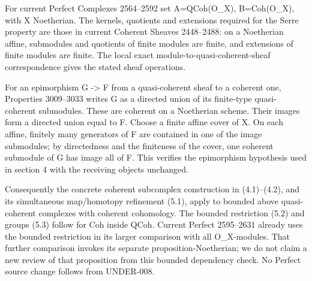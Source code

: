 For current Perfect Complexes 2564–\allowbreak{}2592 set A\allowbreak{}=QCoh(O\_\allowbreak{}X)\allowbreak{},\allowbreak{} B\allowbreak{}=Coh(O\_\allowbreak{}X)\allowbreak{},\allowbreak{} with X Noetherian. The kernels,\allowbreak{} quotients and extensions required for the Serre property are those in current Coherent Sheaves 2448–\allowbreak{}2488:\allowbreak{} on a Noetherian affine,\allowbreak{} submodules and quotients of finite modules are finite,\allowbreak{} and extensions of finite modules are finite. The local exact module-to-quasi-coherent-sheaf correspondence gives the stated sheaf operations.

For an epimorphism G \allowbreak{}-> F from a quasi-coherent sheaf to a coherent one,\allowbreak{} Properties 3009–\allowbreak{}3033 writes G as a directed union of its finite-type quasi-coherent submodules. These are coherent on a Noetherian scheme. Their images form a directed union equal to F. Choose a finite affine cover of X. On each affine,\allowbreak{} finitely many generators of F are contained in one of the image submodules; by directedness and the finiteness of the cover,\allowbreak{} one coherent submodule of G has image all of F. This verifies the epimorphism hypothesis used in section 4 with the receiving objects unchanged.

Consequently the concrete coherent subcomplex construction in (4.1)\allowbreak{}–\allowbreak{}(4.2)\allowbreak{},\allowbreak{} and its simultaneous map/\allowbreak{}homotopy refinement (5.1)\allowbreak{},\allowbreak{} apply to bounded above quasi-coherent complexes with coherent cohomology. The bounded restriction (5.2)\allowbreak{} and groups (5.3)\allowbreak{} follow for Coh inside QCoh. Current Perfect 2595–\allowbreak{}2631 already uses the bounded restriction in its larger comparison with all O\_\allowbreak{}X-modules. That further comparison invokes its separate proposition-Noetherian; we do not claim a new review of that proposition from this bounded dependency check. No Perfect source change follows from UNDER-008.
